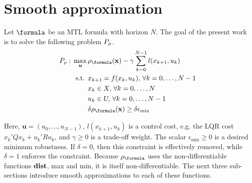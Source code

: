 \section{Smooth approximation}
\label{sec:smooth apx}
\newcommand{\fe}{f_\varepsilon}

Let $\formula$ be an MTL formula with horizon $N$.
The goal of the present work is to solve the following problem $P_\rho$.
\begin{subequations}
	\label{eq:general_ctrl}
	\begin{align}
	P_\rob:\, \max_{\mathbf{u}}\, & \rob_{\formula}(\sstraj) - \gamma \sum_{k=0}^{N-1} l(x_{k+1},u_{k}) \label{eq:general ctrl obj}\\
	\text{s.t. } & x_{k+1} = f(x_k,u_k), \, \forall k=0,\dotsc,N-1 \label{eq:general ctrl dyn}\\
	& x_k \in X, \, \forall k=0,\dotsc,N \label{eq:general ctrl X}\\
	& u_k \in U, \, \forall k=0,\dotsc,N-1 \label{eq:general ctrl U}\\
	& \delta \rob_{\formula}(\sstraj) \geq \delta \epsilon_{\text{min}} \label{eq:general ctrl pos rob}
	\end{align}
\end{subequations}

Here, $\mathbf{u} = (u_0,\ldots,u_{N-1})$, 
$l(x_{k+1},u_{k})$ is a control cost, e.g. the LQR cost $x_k'Qx_k + u_k'Ru_k$,
and $\gamma \geq 0$ is a trade-off weight. 
The scalar $\epsilon_{\text{min}} \geq 0$ is a desired minimum robustness. 
If $\delta = 0$, then this constraint is effectively removed, while $\delta=1$ enforces the constraint.
Because $\robf$ uses the non-differentiable functions $\mathbf{dist}$, max and min, it is itself non-differentiable.
The next three sub-sections introduce smooth approximations to each of these functions.
%



